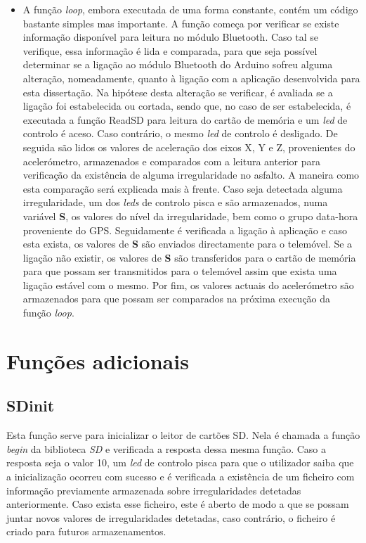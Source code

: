 \begin{itemize}
\item A função \emph{loop}, embora executada de uma forma constante, contém um código bastante simples mas importante.
A função começa por verificar se existe informação disponível para leitura no módulo Bluetooth.
Caso tal se verifique, essa informação é lida e comparada, para que seja possível determinar se a ligação ao módulo Bluetooth do Arduino sofreu alguma alteração, nomeadamente, quanto à ligação com a aplicação desenvolvida para esta dissertação.
Na hipótese desta alteração se verificar, é avaliada se a ligação foi estabelecida ou cortada, sendo que, no caso de ser estabelecida, é executada a função ReadSD para leitura do cartão de memória e um \emph{led} de controlo é aceso.
Caso contrário, o mesmo \emph{led} de controlo é desligado. 
De seguida são lidos os valores de aceleração dos eixos X, Y e Z, provenientes do acelerómetro, armazenados e comparados com a leitura anterior para verificação da existência de alguma irregularidade no asfalto.
A maneira como esta comparação será explicada mais à frente.
Caso seja detectada alguma irregularidade, um dos \emph{leds} de controlo pisca e são armazenados, numa variável \textbf{S}, os valores do nível da irregularidade, bem como o grupo data-hora proveniente do GPS.
Seguidamente é verificada a ligação à aplicação e caso esta exista, os valores de \textbf{S} são enviados directamente para o telemóvel.
Se a ligação não existir, os valores de \textbf{S} são transferidos para o cartão de memória para que possam ser transmitidos para o telemóvel assim que exista uma ligação estável com o mesmo.
Por fim, os valores actuais do acelerómetro são armazenados para que possam ser comparados na próxima execução da função \emph{loop}.
\end{itemize}

\section{Funções adicionais}
\label{sec:funcoes_adicionais}

\subsection{SD\textunderscore init}
\label{sub:sd_init}

Esta função serve para inicializar o leitor de cartões SD.
Nela é chamada a função \emph{begin} da biblioteca \emph{SD} e verificada a resposta dessa mesma função.
Caso a resposta seja o valor 10, um \emph{led} de controlo pisca para que o utilizador saiba que a inicialização ocorreu com sucesso e é verificada a existência de um ficheiro com informação previamente armazenada sobre irregularidades detetadas anteriormente.
Caso exista esse ficheiro, este é aberto de modo a que se possam juntar novos valores de irregularidades detetadas, caso contrário, o ficheiro é criado para futuros armazenamentos.

